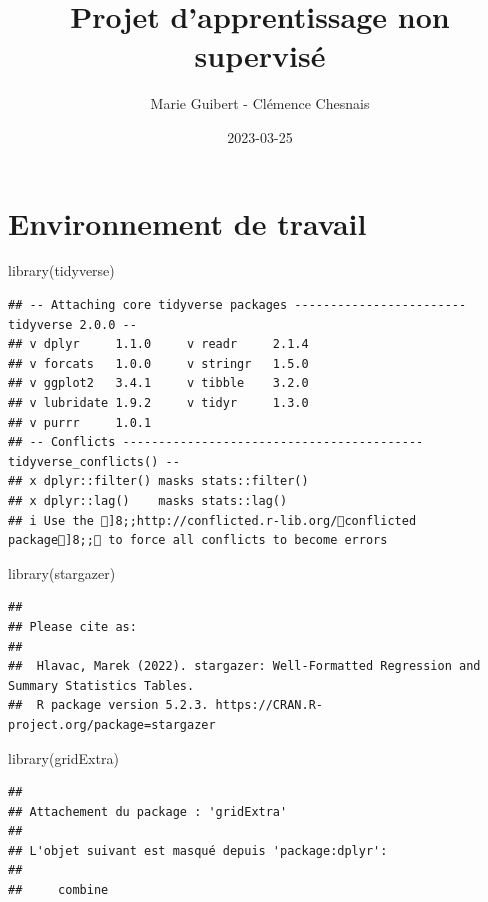 \documentclass[
]{article}
\title{Projet d'apprentissage non supervisé}
\author{Marie Guibert - Clémence Chesnais}
\date{2023-03-25}
\newenvironment{Shaded}{\begin{snugshade}}{\end{snugshade}}
\newcommand{\FunctionTok}[1]{\textcolor[rgb]{0.00,0.00,0.00}{#1}}
\newcommand{\NormalTok}[1]{#1}
\begin{document}
\maketitle

\hypertarget{environnement-de-travail}{%
\section{Environnement de travail}\label{environnement-de-travail}}

\begin{Shaded}
\begin{Highlighting}[]
\FunctionTok{library}\NormalTok{(tidyverse)}
\end{Highlighting}
\end{Shaded}

\begin{verbatim}
## -- Attaching core tidyverse packages ------------------------ tidyverse 2.0.0 --
## v dplyr     1.1.0     v readr     2.1.4
## v forcats   1.0.0     v stringr   1.5.0
## v ggplot2   3.4.1     v tibble    3.2.0
## v lubridate 1.9.2     v tidyr     1.3.0
## v purrr     1.0.1     
## -- Conflicts ------------------------------------------ tidyverse_conflicts() --
## x dplyr::filter() masks stats::filter()
## x dplyr::lag()    masks stats::lag()
## i Use the ]8;;http://conflicted.r-lib.org/conflicted package]8;; to force all conflicts to become errors
\end{verbatim}

\begin{Shaded}
\begin{Highlighting}[]
\FunctionTok{library}\NormalTok{(stargazer)}
\end{Highlighting}
\end{Shaded}

\begin{verbatim}
## 
## Please cite as: 
## 
##  Hlavac, Marek (2022). stargazer: Well-Formatted Regression and Summary Statistics Tables.
##  R package version 5.2.3. https://CRAN.R-project.org/package=stargazer
\end{verbatim}

\begin{Shaded}
\begin{Highlighting}[]
\FunctionTok{library}\NormalTok{(gridExtra)}
\end{Highlighting}
\end{Shaded}

\begin{verbatim}
## 
## Attachement du package : 'gridExtra'
## 
## L'objet suivant est masqué depuis 'package:dplyr':
## 
##     combine
\end{verbatim}
\end{document}
